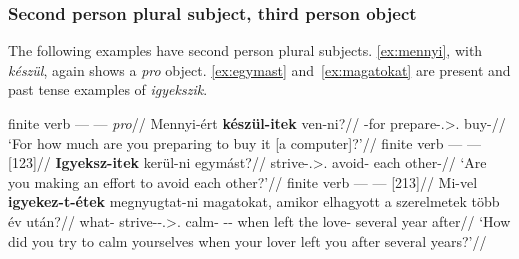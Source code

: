 \subsubsection{Second person plural subject, third person object}\label{sub:2pl-3}

The following examples have second person plural subjects. \eqref{ex:mennyi},
with \emph{készül}, again shows a \emph{pro} object. \eqref{ex:egymast}
and~\eqref{ex:magatokat} are present and past tense examples of
\emph{igyekszik}.

\ex\label{ex:mennyi}%
    \begingl
        \glpreamble finite verb --- \Inf{} --- \emph{pro}//
        \gla 	Mennyi-ért \textbf{készül-itek} ven-ni?//
        -for prepare-\Spl.\Sbj>\Third.\Obj{} buy-\Inf{}//
        \glft 	\enquote*{For how much are you preparing to buy it [a computer]?}\trailingcitation{}//
    \endgl
\xe
\ex\label{ex:egymast}%
    \begingl
        \glpreamble finite verb --- \Inf{} --- \Obj{} [123]//
        \gla 	\textbf{Igyeksz-itek} kerül-ni egymást?//
        \glb 	strive-\Spl.\Sbj>\Third.\Obj{} avoid-\Inf{} {each other}-\Acc{}//
        \glft 	\enquote*{Are you making an effort to avoid each other?}\trailingcitation{}//
    \endgl
\xe
\ex\label{ex:magatokat}%
    \begingl
        \glpreamble finite verb --- \Inf{} --- \Obj{} [213]//
        \gla 	Mi-vel \textbf{igyekez-t-étek} megnyugtat-ni magatokat, amikor elhagyott a szerelmetek több év után?//
        \glb 	what-\Com{} strive-\Pst-\Tsg.\Sbj>\Third.\Obj{} calm-\Inf{} \Refl-\Tpl-\Acc{} when left the love-\Tpl{} several year after//
        \glft 	\enquote*{How did you try to calm yourselves when your lover left you after several years?}\trailingcitation{}//
    \endgl
\xe

